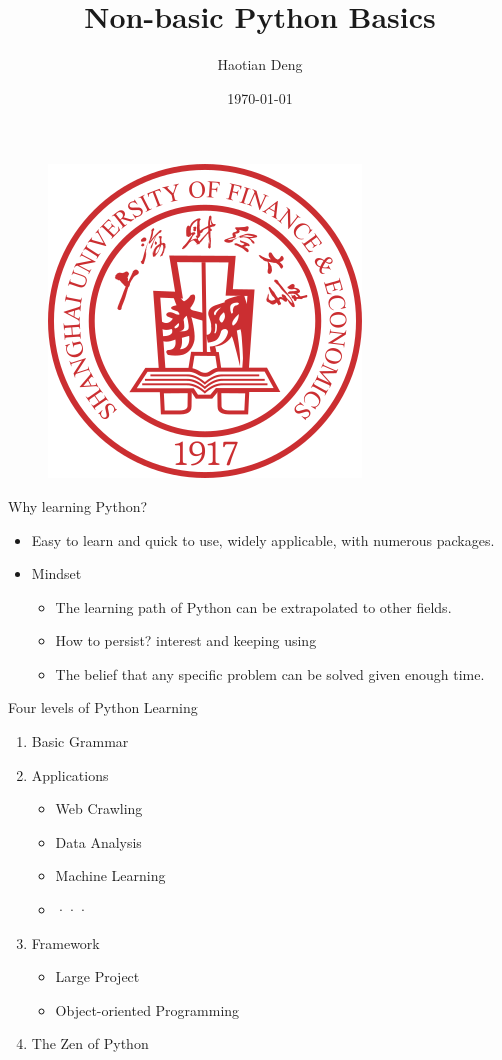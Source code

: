 \documentclass[UTF8, 16pt]{beamer}
\author[Haotian Deng] %
{
Haotian Deng
}
\title[Non-basic Python Basics]{Non-basic Python Basics}
\institute[SUFE]
{
Shanghai University of Finance and Economics
}
\date[VLC 2021]
{\today}
\begin{document}
\begin{CJK*}{UTF8}{gbsn}

\begin{frame}[noframenumbering]
	\titlepage
	\vspace{-0.5cm}
    \begin{figure}[htpb] 
        \begin{center}
            \includegraphics[width=0.19 \linewidth]{sufe_logo.png}
        \end{center}  
    \end{figure}
\end{frame}



\begin{frame}{Why learning Python?}
	\begin{itemize}
		\item Easy to learn and quick to use, widely applicable, with numerous packages.
		\item Mindset
			\begin{itemize}
				\item The learning path of Python can be extrapolated to other fields.
				\item How to persist? interest and keeping using
				\item The belief that any specific problem can be solved given enough time.
			\end{itemize}
	\end{itemize}
\end{frame}
\begin{frame}{Four levels of Python Learning}
	\begin{enumerate}
		\item Basic Grammar
		\item Applications 
			\begin{itemize}
				\item Web Crawling
				\item Data Analysis
				\item Machine Learning
				\item ···
			\end{itemize}
		\item Framework
			\begin{itemize}
				\item Large Project
				\item Object-oriented Programming
			\end{itemize}
		\item The Zen of Python
	\end{enumerate}
\end{frame}


\end{CJK*}
\end{document}
